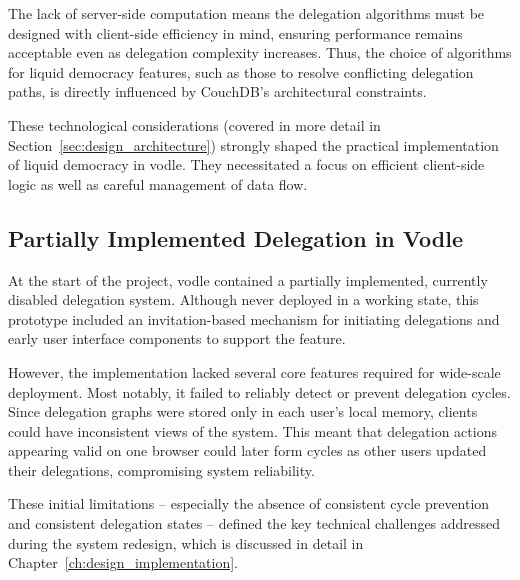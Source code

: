 The lack of server-side computation means the delegation algorithms must be designed with client-side efficiency in mind, ensuring performance remains acceptable even as delegation complexity increases. Thus, the choice of algorithms for liquid democracy features, such as those to resolve conflicting delegation paths, is directly influenced by CouchDB's architectural constraints.

These technological considerations (covered in more detail in Section~\ref{sec:design_architecture}) strongly shaped the practical implementation of liquid democracy in vodle. They necessitated a focus on efficient client-side logic as well as careful management of data flow.

\subsection{Partially Implemented Delegation in Vodle}\label{subsec:background_existing_delegation}
At the start of the project, vodle contained a partially implemented, currently disabled delegation system.  
Although never deployed in a working state, this prototype included an invitation-based mechanism for initiating delegations and early user interface components to support the feature.

However, the implementation lacked several core features required for wide-scale deployment. Most notably, it failed to reliably detect or prevent delegation cycles. Since delegation graphs were stored only in each user's local memory, clients could have inconsistent views of the system. This meant that delegation actions appearing valid on one browser could later form cycles as other users updated their delegations, compromising system reliability.

These initial limitations -- especially the absence of consistent cycle prevention and consistent delegation states -- defined the key technical challenges addressed during the system redesign, which is discussed in detail in Chapter~\ref{ch:design_implementation}.


